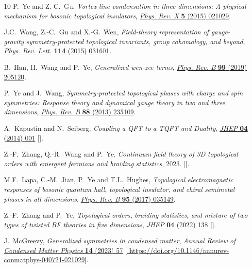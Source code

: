 \documentclass[11pt,nofootinbib,preprint]{revtex4-1}
\begin{document}
\begin{thebibliography}{10}
P.~Ye and Z.-C.~Gu, \emph{Vortex-line condensation in three dimensions: A
  physical mechanism for bosonic topological insulators},
  \href{https://doi.org/10.1103/PhysRevX.5.021029}{\emph{Phys. Rev. X}
  {\bfseries 5} (2015) 021029}.

J.C.~Wang, Z.-C.~Gu and X.-G.~Wen, \emph{Field-theory representation of
  gauge-gravity symmetry-protected topological invariants, group cohomology,
  and beyond},
  \href{https://doi.org/10.1103/PhysRevLett.114.031601}{\emph{Phys. Rev. Lett.}
  {\bfseries 114} (2015) 031601}.

B.~Han, H.~Wang and P.~Ye, \emph{Generalized wen-zee terms},
  \href{https://doi.org/10.1103/PhysRevB.99.205120}{\emph{Phys. Rev. B}
  {\bfseries 99} (2019) 205120}.

P.~Ye and J.~Wang, \emph{Symmetry-protected topological phases with charge and
  spin symmetries: Response theory and dynamical gauge theory in two and three
  dimensions}, \href{https://doi.org/10.1103/PhysRevB.88.235109}{\emph{Phys.
  Rev. B} {\bfseries 88} (2013) 235109}.

A.~Kapustin and N.~Seiberg, \emph{{Coupling a QFT to a TQFT and Duality}},
  \href{https://doi.org/10.1007/JHEP04(2014)001}{\emph{JHEP} {\bfseries 04}
  (2014) 001} [\href{https://arxiv.org/abs/1401.0740}{{}}].

Z.-F.~{Zhang}, Q.-R.~{Wang} and P.~{Ye}, \emph{{Continuum field theory of 3D
		topological orders with emergent fermions and braiding statistics}}, 2023.
 [\href{https://arxiv.org/abs/2307.09983}{{}}].

M.F.~Lapa, C.-M.~Jian, P.~Ye and T.L.~Hughes, \emph{Topological electromagnetic
  responses of bosonic quantum hall, topological insulator, and chiral
  semimetal phases in all dimensions},
  \href{https://doi.org/10.1103/PhysRevB.95.035149}{\emph{Phys. Rev. B}
  {\bfseries 95} (2017) 035149}.

Z.-F.~Zhang and P.~Ye, \emph{{Topological orders, braiding statistics, and
  mixture of two types of twisted BF theories in five dimensions}},
  \href{https://doi.org/10.1007/JHEP04(2022)138}{\emph{JHEP} {\bfseries 04}
  (2022) 138} [\href{https://arxiv.org/abs/2104.07067}{{}}].

J.~McGreevy, \emph{Generalized symmetries in condensed matter},
  \href{https://doi.org/10.1146/annurev-conmatphys-040721-021029}{\emph{Annual
  Review of Condensed Matter Physics} {\bfseries 14} (2023) 57}
  [\href{https://arxiv.org/abs/https://doi.org/10.1146/annurev-conmatphys-040721-021029}{{\ttfamily
  https://doi.org/10.1146/annurev-conmatphys-040721-021029}}].

\end{thebibliography}
\end{document}
